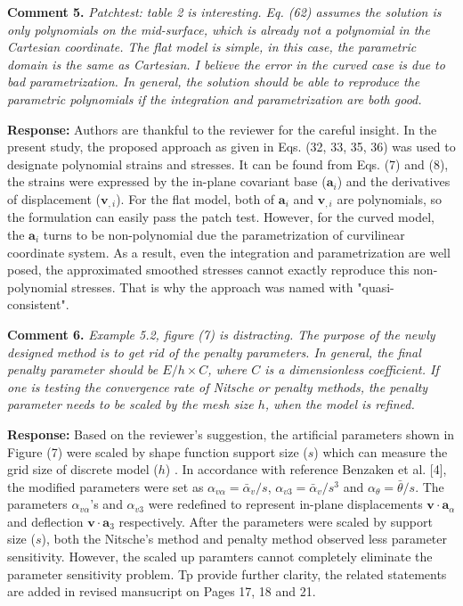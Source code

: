 \documentclass{article}
\begin{document}
\textbf{Comment 5.} \textit{Patchtest: table 2 is interesting. Eq. (62) assumes the solution is only polynomials on the mid-surface, which is already not a polynomial in the Cartesian coordinate. The flat model is simple, in this case, the parametric domain is the same as Cartesian. I believe the error in the curved case is due to bad parametrization. In general, the solution should be able to reproduce the parametric polynomials if the integration and parametrization are both good.}

\textbf{Response:} Authors are thankful to the reviewer for the careful insight. In the present study, the proposed approach as given in Eqs. (32, 33, 35, 36) was used to designate polynomial strains and stresses. 
It can be found from Eqs. (7) and (8), the strains were expressed by the in-plane covariant base ($\boldsymbol a_i$) and the derivatives of displacement ($\boldsymbol v_{,i}$).
For the flat model, both of $\boldsymbol a_i$ and $\boldsymbol v_{,i}$ are polynomials, so the formulation can easily pass the patch test. 
However, for the curved model, the $\boldsymbol a_i$ turns to be non-polynomial due the parametrization of curvilinear coordinate system.
As a result, even the integration and parametrization are well posed, the approximated smoothed stresses cannot exactly reproduce this non-polynomial stresses. 
That is why the approach was named with "quasi-consistent".
 
\textbf{Comment 6.} \textit{Example 5.2, figure (7) is distracting. The purpose of the newly designed method is to get rid of the penalty parameters. In general, the final penalty parameter should be $E/h\times C$, where $C$ is a dimensionless coefficient. If one is testing the convergence rate of Nitsche or penalty methods, the penalty parameter needs to be scaled by the mesh size $h$, when the model is refined.}

\textbf{Response:} Based on the reviewer's suggestion, the artificial parameters shown in Figure (7) were scaled by shape function support size ($s$) which can measure the grid size of discrete model ($h$) . In accordance with reference Benzaken et al. [4], the modified parameters were set as $\alpha_{v\alpha} = \bar\alpha_v / s$, $\alpha_{v3} = \bar\alpha_v / s^3$ and $\alpha_\theta = \bar \theta / s$. The parameters $\alpha_{v\alpha}$'s and $\alpha_{v3}$ were redefined to represent in-plane displacements $\boldsymbol v \cdot \boldsymbol a_\alpha$ and deflection $\boldsymbol v \cdot \boldsymbol a_3$ respectively. After the parameters were scaled by support size ($s$), both the Nitsche's method and penalty method observed less parameter sensitivity. However, the scaled up paramters cannot completely eliminate the parameter sensitivity problem. Tp provide further clarity, the related statements are added in revised mansucript on Pages 17, 18 and 21.
\end{document}
